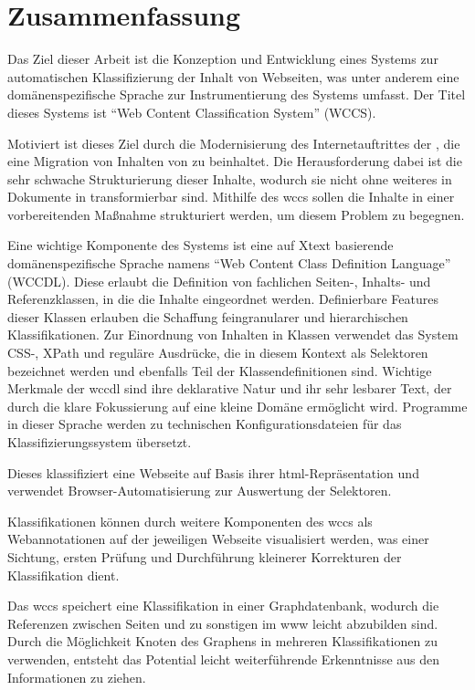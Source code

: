 \section{Zusammenfassung}
    Das Ziel dieser Arbeit ist die Konzeption und Entwicklung
    eines Systems zur automatischen Klassifizierung der Inhalt
    von Webseiten, was unter anderem eine domänenspezifische
    Sprache zur Instrumentierung des Systems umfasst.
    Der Titel dieses Systems ist
    "`Web Content Classification System"' (WCCS).

    Motiviert ist dieses Ziel durch die Modernisierung des
    Internetauftrittes der {\fernUni},
    die eine Migration von Inhalten von {\wordpress} zu
    {\imperia} beinhaltet.
    Die Herausforderung dabei ist die sehr schwache Strukturierung
    dieser Inhalte, wodurch sie nicht ohne weiteres in
    Dokumente in {\imperia} transformierbar sind.
    Mithilfe des \gls{wccs} sollen die Inhalte in einer vorbereitenden
    Maßnahme strukturiert werden, um diesem Problem zu begegnen.

    Eine wichtige Komponente des Systems ist eine auf Xtext basierende
    domänenspezifische Sprache namens "`Web Content Class Definition Language"' (WCCDL).
    Diese erlaubt die Definition von fachlichen Seiten-, Inhalts- und
    Referenzklassen, in die die Inhalte eingeordnet werden.
    Definierbare Features dieser Klassen erlauben die Schaffung feingranularer
    und hierarchischen Klassifikationen.
    Zur Einordnung von Inhalten in Klassen verwendet das System
    CSS-, XPath und reguläre Ausdrücke, die in diesem Kontext als
    Selektoren bezeichnet werden und
    ebenfalls Teil der Klassendefinitionen sind.
    Wichtige Merkmale der \gls{wccdl} sind ihre deklarative Natur
    und ihr sehr lesbarer Text,
    der durch die klare Fokussierung auf eine kleine Domäne ermöglicht wird.
    Programme in dieser Sprache werden zu technischen
    Konfigurationsdateien für das Klassifizierungssystem übersetzt.

    Dieses klassifiziert eine Webseite auf Basis ihrer
    \gls{html}-Repräsentation und verwendet Browser-Automatisierung
    zur Auswertung der Selektoren.

    Klassifikationen können durch weitere Komponenten des \gls{wccs}
    als Webannotationen auf der jeweiligen Webseite visualisiert werden,
    was einer Sichtung, ersten Prüfung und Durchführung kleinerer
    Korrekturen der Klassifikation dient.

    Das \gls{wccs} speichert eine Klassifikation in einer Graphdatenbank,
    wodurch die Referenzen zwischen Seiten und zu sonstigen {\resources}
    im \gls{www} leicht abzubilden sind.
    Durch die Möglichkeit Knoten des Graphens in mehreren Klassifikationen
    zu verwenden, entsteht das Potential leicht weiterführende Erkenntnisse
    aus den Informationen zu ziehen.

